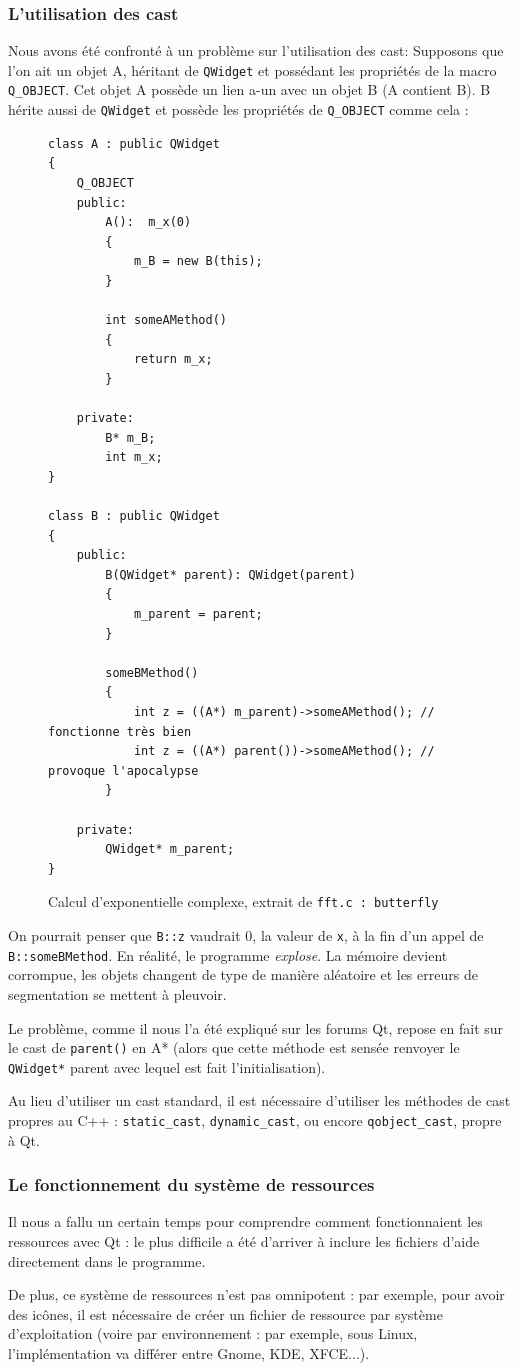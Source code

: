 \subsubsection{L'utilisation des cast}
Nous avons été confronté à un problème sur l'utilisation des cast:
Supposons que l'on ait un objet A, héritant de \texttt{QWidget} et possédant les propriétés de la macro \texttt{Q\_OBJECT}.
Cet objet A possède un lien a-un avec un objet B (A contient B).
B hérite aussi de \texttt{QWidget} et possède les propriétés de \texttt{Q\_OBJECT} comme cela :
\begin{figure}[H]
\begin{lstlisting}
class A : public QWidget
{
	Q_OBJECT
	public:
		A():  m_x(0)
		{
			m_B = new B(this);
		}

		int someAMethod()
		{
			return m_x;
		}

	private:
		B* m_B;
		int m_x;
}

class B : public QWidget
{
	public:
		B(QWidget* parent): QWidget(parent)
		{
			m_parent = parent;
		}

		someBMethod()
		{
			int z = ((A*) m_parent)->someAMethod(); // fonctionne très bien
			int z = ((A*) parent())->someAMethod(); // provoque l'apocalypse
		}

	private:
		QWidget* m_parent;
}
\end{lstlisting}
\caption{Calcul d'exponentielle complexe, extrait de \texttt{fft.c : butterfly}}
\label{api_cexp}
\end{figure}

On pourrait penser que \texttt{B::z} vaudrait $0$, la valeur de \texttt{x}, à la fin d'un appel de \texttt{B::someBMethod}.
En réalité, le programme \textit{explose}. La mémoire devient corrompue, les objets
changent de type de manière aléatoire et les erreurs de segmentation se mettent à pleuvoir.

Le problème, comme il nous l'a été expliqué sur les forums Qt, repose en fait sur le cast de \texttt{parent()}
en A* (alors que cette méthode est sensée renvoyer le \texttt{QWidget*} parent avec lequel est fait l'initialisation).

Au lieu d'utiliser un cast standard, il est nécessaire d'utiliser les méthodes de cast propres au C++ :
\texttt{static\_cast}, \texttt{dynamic\_cast}, ou encore \texttt{qobject\_cast}, propre à Qt.

\subsubsection{Le fonctionnement du système de ressources}
Il nous a fallu un certain temps pour comprendre comment fonctionnaient les ressources avec Qt :
le plus difficile a été d'arriver à inclure les fichiers d'aide directement dans le programme.

De plus, ce système de ressources n'est pas omnipotent : par exemple, pour avoir des icônes, il est
nécessaire de créer un fichier de ressource par système d'exploitation (voire par environnement : par exemple,
sous Linux, l'implémentation va différer entre Gnome, KDE, XFCE...).
